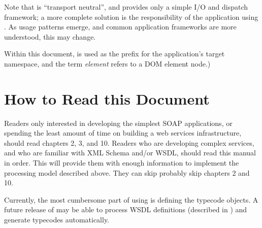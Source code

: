 Note that \ZSI{} is ``transport neutral'', and provides only a simple
I/O and dispatch framework; a more complete solution is the
responsibility of the application using \ZSI{}.
As usage patterns emerge, and common application frameworks are
more understood, this may change.

Within this document,  is used as the prefix for the
application's target namespace, and the term
\emph{element} refers to a DOM element node.)

\section{How to Read this Document}

Readers only interested in developing the simplest SOAP applications,
or spending the least amount of time on building a web services
infrastructure, should read chapters 2, 3, and 10.
Readers who are developing complex services, and who are familiar
with XML Schema and/or WSDL, should read this manual in order.
This will provide them with enough information to implement the
processing model described above.
They can skip probably skip chapters 2 and 10.

Currently, the most cumbersome part of using \ZSI{} is
defining the typecode objects.
A future release of \ZSI{} may be able to
process WSDL definitions (described in
)
and generate typecodes automatically.

